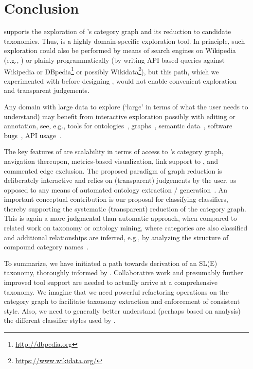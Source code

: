
\section{Conclusion}
\label{S:concl}

\WikiTax{} supports the exploration of \Wikipedia's category graph and its reduction to candidate taxonomies. Thus, \WikiTax{} is a highly domain-specific exploration tool. In principle, such exploration could also be performed by means of search engines on Wikipedia (e.g., \cite{MilneW11a}) or plainly programmatically (by writing API-based queries against Wikipedia or DBpedia\footnote{\url{http://dbpedia.org}} or possibly Wikidata\footnote{\url{https://www.wikidata.org/}}), but this path, which we experimented with before designing \WikiTax, would not enable convenient exploration and transparent judgements.

Any domain with large data to explore (`large' in terms of what the user needs to understand) may benefit from interactive exploration possibly with editing or annotation, see, e.g., tools for ontologies~\cite{BaskayaKJ10}, graphs~\cite{HaunNKTB10}, semantic data~\cite{DumasBHS12}, software bugs~\cite{HoraADBCVM12}, API usage~\cite{RooverLP13}.

The key features of \WikiTax{} are scalability in terms of access to \Wikipedia's category graph, navigation thereupon, metrics-based visualization, link support to \Wikipedia, and commented edge exclusion. The proposed paradigm of graph reduction is deliberately interactive and relies on (transparent) judgements by the user, as opposed to any means of automated ontology extraction / generation~\cite{WuW08,SuchanekKW08}. An important conceptual contribution is our proposal for classifying classifiers, thereby supporting the systematic (transparent) reduction of the category graph. This is again a more judgmental than automatic approach, when compared to related work on taxonomy or ontology mining, where categories are also classified and additional relationships are inferred, e.g., by analyzing the structure of compound category names~\cite{NastaseS08}.

To summarize, we have initiated a path towards derivation of an SL(E) taxonomy, thoroughly informed by \Wikipedia. Collaborative work and presumably further improved tool support are needed to actually arrive at a comprehensive taxonomy. We imagine that we need powerful refactoring operations on the category graph to 
facilitate taxonomy extraction and enforcement of consistent style. Also, we need to generally better understand (perhaps based on analysis) the different classifier styles used by \Wikipedia.

